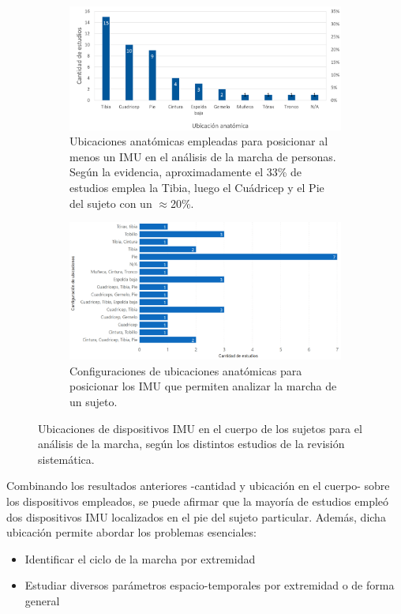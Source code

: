\begin{figure}
     \centering
     \begin{subfigure}[b]{1\textwidth}
         \centering
         \includegraphics[width=\textwidth]{TESIS/imagenes/chap03/ubicaciones-anatomicas.PNG}
         \caption{Ubicaciones anatómicas empleadas para posicionar al menos un IMU en el análisis de la marcha de personas. Según la evidencia, aproximadamente el 33\% de estudios emplea la Tibia, luego el Cuádricep y el Pie del sujeto con un $\approx$20\%. }
     \end{subfigure}
     \begin{subfigure}[b]{1\textwidth}
        \centering
        \includegraphics[width=\textwidth]{TESIS/imagenes/chap03/sintesis_location.PNG}
        \caption{Configuraciones de ubicaciones anatómicas para posicionar los IMU que permiten analizar la marcha de un sujeto.}
     \end{subfigure}
     \caption{Ubicaciones de dispositivos IMU en el cuerpo de los sujetos para el análisis de la marcha, según los distintos estudios de la revisión sistemática.}
     \label{fig:synthesis_location}
 \end{figure}


Combinando los resultados anteriores -cantidad y ubicación en el cuerpo- sobre los dispositivos empleados, se puede afirmar que la mayoría de estudios empleó dos dispositivos IMU localizados en el pie del sujeto particular. Además, dicha ubicación permite abordar los problemas esenciales:
\begin{itemize}
    \item Identificar el ciclo de la marcha por extremidad
    \item Estudiar diversos parámetros espacio-temporales por extremidad o de forma general
\end{itemize} 

